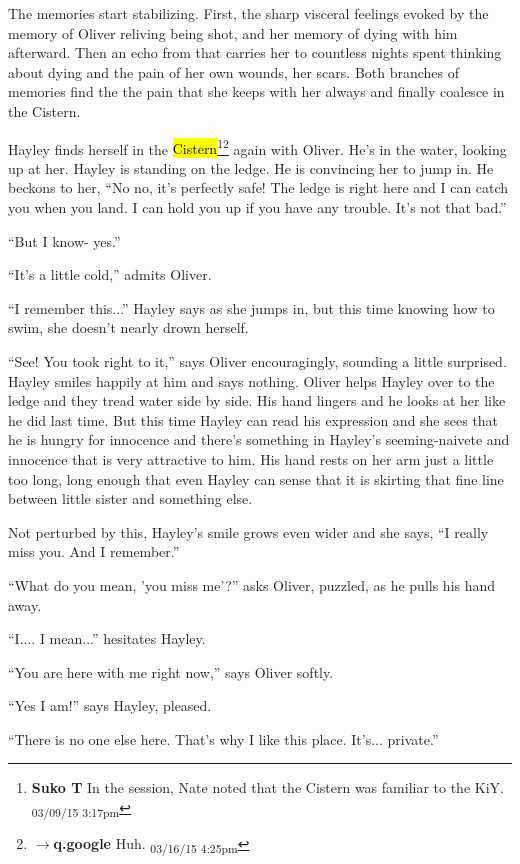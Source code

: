 The memories start stabilizing.  First, the sharp visceral feelings evoked by the memory of Oliver reliving being shot, and her memory of dying with him afterward. Then an echo from that carries her to countless nights spent thinking about dying and the pain of her own wounds, her scars.  Both branches of memories find the the pain that she keeps with her always and finally coalesce in the Cistern.



Hayley finds herself in the \hl{Cistern}\footnote{\textbf{Suko T }In the session, Nate noted that the Cistern was familiar to the KiY. \textsubscript{03/09/15 3:17pm}}\footnote{$\rightarrow$\textbf{q.google }Huh. \textsubscript{03/16/15 4:25pm}} again with Oliver.  He's in the water, looking up at her.  Hayley is standing on the ledge.  He is convincing her to jump in.  He beckons to her, ``No no, it's perfectly safe! The ledge is right here and I can catch you when you land.  I can hold you up if you have any trouble.  It's not that bad.''

``But I know- yes.''

``It's a little cold,'' admits Oliver.

``I remember this...'' Hayley says as she jumps in, but this time knowing how to swim, she doesn't nearly drown herself.

``See! You took right to it,'' says Oliver encouragingly, sounding a little surprised.  Hayley smiles happily at him and says nothing.  Oliver helps Hayley over to the ledge and they tread water side by side.  His hand lingers and he looks at her like he did last time.  But this time Hayley can read his expression and she sees that he is hungry for innocence and there's something in Hayley's seeming-naivete and innocence that is very attractive to him.  His hand rests on her arm just a little too long, long enough that even Hayley can sense that it is skirting that fine line between little sister and something else.  

Not perturbed by this, Hayley's smile grows even wider and she says, ``I really miss you.  And I remember.''

``What do you mean, 'you miss me'?'' asks Oliver, puzzled, as he pulls his hand away.

``I.... I mean...'' hesitates Hayley.

``You are here with me right now,'' says Oliver softly.  

``Yes I am!'' says Hayley, pleased.

``There is no one else here.  That's why I like this place.  It's... private.''

